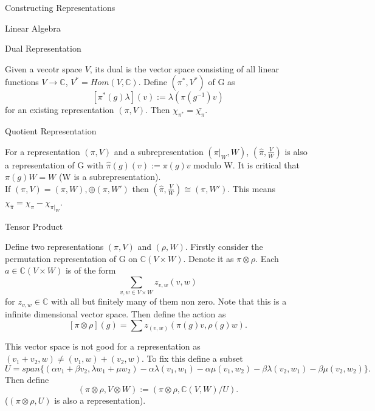 \documentclass[12pt, letterpaper]{article}
\newcommand{\C}{\mathbb{C}}
\begin{document}
\begin{section}{Constructing Representations}

  \begin{subsection}{Linear Algebra}

    \begin{subsubsection}{Dual Representation}

      Given a vecotr space \(V\), its dual is the vector space consisting of all
      linear functions \(V \to \C\), \(V^{*} = Hom(V, \C)\). Define
      \((\pi^{*}, V^{*})\) of G as \[[\pi^{*}(g) \lambda](v) :=
        \lambda (\pi(g^{-1})v)\] for an existing representation \((\pi, V)\).
      Then \(\chi_{\pi^{*}} = \bar{\chi_{\pi}}\).

    \end{subsubsection}

    \begin{subsubsection}{Quotient Representation}

      For a representation \((\pi, V)\) and a subrepresentation
      \((\pi|_{W}, W)\), \((\hat{\pi}, \frac{V}{W})\) is also a representation
      of G with \(\hat{\pi}(g)(v) := \pi(g)v\) modulo W. It is critical that
      \(\pi(g)W = W\) (W is a subrepresentation). \\
      If \((\pi, V) = (\pi, W), \oplus (\pi, W')\) then
      \((\hat{\pi}, \frac{V}{W}) \cong (\pi, W')\). This means
      \(\chi_{\hat{\pi}} = \chi_{\pi} - \chi_{\pi|_{W}}\).

    \end{subsubsection}

    \begin{subsubsection}{Tensor Product}

      Define two representations \((\pi, V)\) and \((\rho, W)\). Firstly
      consider the permutation representation of G on \(\C(V \times W)\). Denote
      it as \(\pi \otimes \rho\). Each \(a \in \C(V \times W)\) is of the
      form \[\sum_{v, w \in V \times W} z_{v, w} (v, w)\] for
      \(z_{v, w} \in \C\) with all but finitely many of them non zero. Note that
      this is a infinite dimensional vector space. Then define the action
      as \[[\pi \otimes \rho](g) = \sum z_{(v, w)} (\pi(g)v, \rho(g)w).\]

      This vector space is not good for a representation as
      \((v_{1} + v_{2}, w) \neq (v_{1}, w) + (v_{2}, w)\). To fix this define a
      subset \[U = span\{(\alpha v_{1} + \beta v_{2}, \lambda w_{1} + \mu w_{2})
        - \alpha \lambda (v_{1}, w_{1}) - \alpha \mu (v_{1}, w_{2}) - \beta
        \lambda (v_{2}, w_{1}) - \beta \mu (v_{2}, w_{2})\}.\] Then define
      \[(\pi \otimes \rho, V \otimes W) := (\pi \otimes \rho, \C(V, W) / U).\]
      (\((\pi \otimes \rho, U)\) is also a representation).


\end{subsubsection}
\end{subsection}
\end{section}
\end{document}
